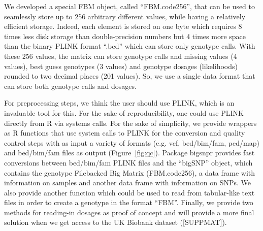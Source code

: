 \documentclass{bioinfo}
\begin{document}
\begin{methods}
{\color{red}
We developed a special FBM object, called ``FBM.code256'', that can be used to seamlessly store up to 256 arbitrary different values, while having a relatively efficient storage. Indeed, each element is stored on one byte which requires 8 times less disk storage than double-precision numbers but 4 times more space than the binary PLINK format ``.bed'' which can store only genotype calls. With these 256 values, the matrix can store genotype calls and missing values (4 values), best guess genotypes (3 values) and genotype dosages (likelihoods) rounded to two decimal places (201 values). So, we use a single data format that can store both genotype calls and dosages.

For preprocessing steps, we think the user should use PLINK, which is an invaluable tool for this. For the sake of reproducibility, one could use PLINK directly from R via systems calls. For the sake of simplicity, we provide wrappers as R functions that use system calls to PLINK for the conversion and quality control steps with as input a variety of formats (e.g. vcf, bed/bim/fam, ped/map) and bed/bim/fam files as output (Figure~\ref{fig:qc}).
Package bigsnpr provides fast conversions between bed/bim/fam PLINK files and the ``bigSNP'' object, which contains the genotype Filebacked Big Matrix (FBM.code256), a data frame with information on samples and another data frame with information on SNPs. We also provide another function which could be used to read from tabular-like text files in order to create a genotype in the format ``FBM''. Finally, we provide two methods for reading-in dosages as proof of concept and will provide a more final solution when we get access to the UK Biobank dataset ([SUPPMAT]).

}
\end{methods}
\end{document}
